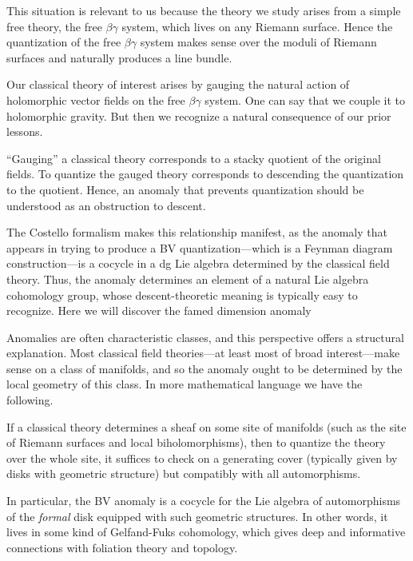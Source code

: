 This situation is relevant to us because the theory we study arises from a simple free theory,
the free $\beta\gamma$ system, which lives on any Riemann surface.
Hence the quantization of the free $\beta\gamma$ system makes sense over the moduli of Riemann surfaces and naturally produces a line bundle.

Our classical theory of interest arises by gauging the natural action of holomorphic vector fields on the free $\beta\gamma$ system.
One can say that we couple it to holomorphic gravity.
But then we recognize a natural consequence of our prior lessons.

\begin{lesson}
``Gauging'' a classical theory corresponds to a stacky quotient of the original fields. 
To quantize the gauged theory corresponds to descending the quantization to the quotient.
Hence, an anomaly that prevents quantization should be understood as an obstruction to descent.
\end{lesson}

The Costello formalism makes this relationship manifest, 
as the anomaly that appears in trying to produce a BV quantization---which is a Feynman diagram construction---is a cocycle in a dg Lie algebra determined by the classical field theory.
Thus, the anomaly determines an element of a natural Lie algebra cohomology group,
whose descent-theoretic meaning is typically easy to recognize.
Here we will discover the famed dimension anomaly 

Anomalies are often characteristic classes, and this perspective offers a structural explanation.
Most classical field theories---at least most of broad interest---make sense on a class of manifolds,
and so the anomaly ought to be determined by the local geometry of this class.
In more mathematical language we have the following.

\begin{lesson}
If a classical theory determines a sheaf on some site of manifolds (such as the site of Riemann surfaces and local biholomorphisms), 
then to quantize the theory over the whole site, 
it suffices to check on a generating cover (typically given by disks with geometric structure) but compatibly with all automorphisms.
\end{lesson}

In particular, the BV anomaly is a cocycle for the Lie algebra of automorphisms of the {\em formal} disk equipped with such geometric structures.
In other words, it lives in some kind of Gelfand-Fuks cohomology, which gives deep and informative connections with foliation theory and topology.


